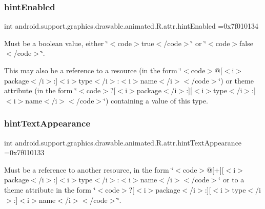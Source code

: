 \subsubsection{\texorpdfstring{hint\+Enabled}{hintEnabled}}
{\footnotesize\ttfamily int android.\+support.\+graphics.\+drawable.\+animated.\+R.\+attr.\+hint\+Enabled =0x7f010134\hspace{0.3cm}{\ttfamily [static]}}

Must be a boolean value, either \char`\"{}$<$code$>$true$<$/code$>$\char`\"{} or \char`\"{}$<$code$>$false$<$/code$>$\char`\"{}. 

This may also be a reference to a resource (in the form \char`\"{}$<$code$>$@\mbox{[}$<$i$>$package$<$/i$>$\+:\mbox{]}$<$i$>$type$<$/i$>$\+:$<$i$>$name$<$/i$>$$<$/code$>$\char`\"{}) or theme attribute (in the form \char`\"{}$<$code$>$?\mbox{[}$<$i$>$package$<$/i$>$\+:\mbox{]}\mbox{[}$<$i$>$type$<$/i$>$\+:\mbox{]}$<$i$>$name$<$/i$>$$<$/code$>$\char`\"{}) containing a value of this type. \mbox{\label{classandroid_1_1support_1_1graphics_1_1drawable_1_1animated_1_1R_1_1attr_a5d392e948cd7a4e94ce70f51435c13b6}} 
\subsubsection{\texorpdfstring{hint\+Text\+Appearance}{hintTextAppearance}}
{\footnotesize\ttfamily int android.\+support.\+graphics.\+drawable.\+animated.\+R.\+attr.\+hint\+Text\+Appearance =0x7f010133\hspace{0.3cm}{\ttfamily [static]}}

Must be a reference to another resource, in the form \char`\"{}$<$code$>$@\mbox{[}+\mbox{]}\mbox{[}$<$i$>$package$<$/i$>$\+:\mbox{]}$<$i$>$type$<$/i$>$\+:$<$i$>$name$<$/i$>$$<$/code$>$\char`\"{} or to a theme attribute in the form \char`\"{}$<$code$>$?\mbox{[}$<$i$>$package$<$/i$>$\+:\mbox{]}\mbox{[}$<$i$>$type$<$/i$>$\+:\mbox{]}$<$i$>$name$<$/i$>$$<$/code$>$\char`\"{}. \mbox{\label{classandroid_1_1support_1_1graphics_1_1drawable_1_1animated_1_1R_1_1attr_a246dce0b8806639e751babf1a5504c8d}} 
